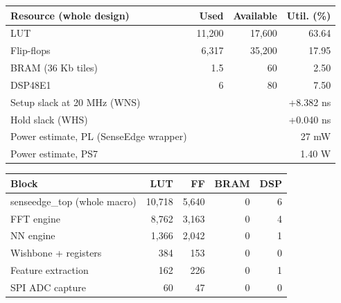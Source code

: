 \begin{tabular}{@{}lrrr@{}}
\toprule
Resource (whole design) & Used & Available & Util. (\%) \\
\midrule
LUT & 11,200 & 17,600 & 63.64 \\
Flip-flops & 6,317 & 35,200 & 17.95 \\
BRAM (36 Kb tiles) & 1.5 & 60 & 2.50 \\
DSP48E1 & 6 & 80 & 7.50 \\
\midrule
Setup slack at 20 MHz (WNS) & \multicolumn{3}{r}{+8.382 ns} \\
Hold slack (WHS) & \multicolumn{3}{r}{+0.040 ns} \\
Power estimate, PL (SenseEdge wrapper) & \multicolumn{3}{r}{27 mW} \\
Power estimate, PS7 & \multicolumn{3}{r}{1.40 W} \\
\bottomrule
\end{tabular}

\begin{tabular}{@{}lrrrr@{}}
\toprule
Block & LUT & FF & BRAM & DSP \\
\midrule
senseedge\_top (whole macro) & 10,718 & 5,640 & 0 & 6 \\
FFT engine & 8,762 & 3,163 & 0 & 4 \\
NN engine & 1,366 & 2,042 & 0 & 1 \\
Wishbone + registers & 384 & 153 & 0 & 0 \\
Feature extraction & 162 & 226 & 0 & 1 \\
SPI ADC capture & 60 & 47 & 0 & 0 \\
\bottomrule
\end{tabular}
